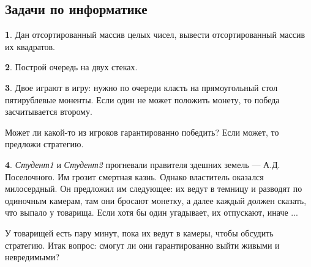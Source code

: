 \documentclass[14pt, a4paper]{extarticle}
\theoremstyle{definition}
\newtheorem{problem}{}
\theoremstyle{definition}
\theoremstyle{remark}
\numberwithin{equation}{section}
\begin{document}
\subsection*{Задачи по информатике}

\begin{problem}
    Дан отсортированный массив целых чисел, вывести 
    отсортированный массив их квадратов.
\end{problem}

\begin{problem}
    Построй очередь на двух стеках.
\end{problem}

\begin{problem}
    Двое играют в игру: нужно по очереди класть на прямоугольный
    стол пятирублевые моненты. Если один не может положить 
    монету, то победа засчитывается второму.

    Может ли какой-то из игроков гарантированно победить? Если может,
    то предложи стратегию.
\end{problem}

\begin{problem}
    \textit{Студент1} и \textit{Студент2} прогневали правителя
    здешних земель --- А.Д. Поселочного. Им грозит смертная казнь.
    Однако властитель оказался милосердный. Он предложил
    им следующее: их ведут в темницу и разводят по одиночным камерам,
    там они бросают монетку, а далее каждый должен сказать,
    что выпало у товарища. Если хотя бы один угадывает, их отпускают, 
    иначе ...

    У товарищей есть пару минут, пока их ведут в камеры, чтобы 
    обсудить стратегию. Итак вопрос: смогут ли они гарантированно выйти
    живыми и невредимыми?
\end{problem}
\end{document}
